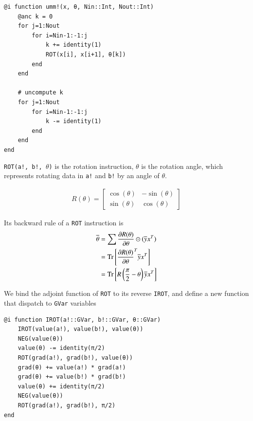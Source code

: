 \documentclass[aps,twocolumn,longbibliography,english,superscriptaddress,prr]{revtex4-1}
\newcommand{\<}{\langle}
\renewcommand{\>}{\rangle}
\newcommand{\Tr}{{\rm Tr}}
\theoremstyle{definition}\newtheorem{definition}{\textit{Definition}}
\begin{document}
\begin{minipage}{.44\textwidth}
\begin{lstlisting}
@i function umm!(x, θ, Nin::Int, Nout::Int)
    @anc k = 0
    for j=1:Nout
        for i=Nin-1:-1:j
            k += identity(1)
            ROT(x[i], x[i+1], θ[k])
        end
    end

    # uncompute k
    for j=1:Nout
        for i=Nin-1:-1:j
            k -= identity(1)
        end
    end
end
\end{lstlisting}
\end{minipage}

\texttt{ROT(a!, b!, $\theta$)} is the rotation instruction, \texttt{$\theta$} is the rotation angle, which represents rotating data in \texttt{a!} and \texttt{b!} by an angle of $\theta$.

\begin{align}
    R(\theta)  = \begin{bmatrix}
        \cos(\theta) & - \sin(\theta)\\
        \sin(\theta)  & \cos(\theta)
    \end{bmatrix}
\end{align}


Its backward rule of a \texttt{ROT} instruction is
\begin{align}
    \begin{split}
    \overline{\theta}  &= \sum\frac{\partial R(\theta)}{\partial \theta}\odot(\overline{y}x^T)\\
    &= \Tr\left[\frac{\partial R(\theta)}{\partial \theta}^T\overline{y}x^T\right]\\
    &= \Tr\left[R\left(\frac{\pi}{2}-\theta\right)\overline{y}x^T\right]
    \end{split}
\end{align}

We bind the adjoint function of \texttt{ROT} to its reverse \texttt{IROT},
and define a new function that dispatch to \texttt{GVar} variables

\begin{minipage}{.44\textwidth}
\begin{lstlisting}
@i function IROT(a!::GVar, b!::GVar, θ::GVar)
    IROT(value(a!), value(b!), value(θ))
    NEG(value(θ))
    value(θ) -= identity(π/2)
    ROT(grad(a!), grad(b!), value(θ))
    grad(θ) += value(a!) * grad(a!)
    grad(θ) += value(b!) * grad(b!)
    value(θ) += identity(π/2)
    NEG(value(θ))
    ROT(grad(a!), grad(b!), π/2)
end
\end{lstlisting}
\end{minipage}
\end{document}
